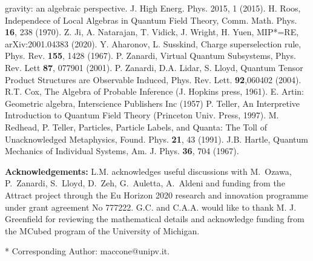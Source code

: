 \documentclass[aps,prl,amsmath,amssymb,twocolumn,nofootinbib]{revtex4}
\theoremstyle{plain}
\theoremstyle{definition}
\theoremstyle{remark}
\begin{document}
\begin{references}
		gravity: an algebraic perspective. J. High Energ. Phys. 2015, 1
		(2015).%
		H. Roos, Independece of Local Algebras in Quantum Field
		Theory, Comm.  Math. Phys. {\bf 16}, 238 (1970).
		Z. Ji, A. Natarajan, T. Vidick, J. Wright, H. Yuen, MIP*=RE, arXiv:2001.04383 (2020). %
		Y. Aharonov, L. Susskind, Charge superselection
		rule, Phys. Rev. {\bf 155}, 1428 (1967).
		P. Zanardi, Virtual Quantum Subsystems, Phys. Rev.
		Lett {\bf 87}, 077901 (2001).
		 P. Zanardi, D.A. Lidar, S. Lloyd, Quantum
		Tensor Product Structures are Observable Induced, Phys. Rev. Lett.
		{\bf 92},060402 (2004).
		R.T. Cox, The Algebra of Probable Inference (J. Hopkins
		press, 1961).
		 E. Artin: Geometric algebra, Interscience Publishers Inc (1957)
		P. Teller, An Interpretive Introduction to Quantum
		Field Theory (Princeton Univ. Press, 1997).  
		M. Redhead, P. Teller, Particles, Particle Labels, and
		Quanta: The Toll of Unacknowledged Metaphysics, Found. Phys. {\bf
			21}, 43 (1991).
		J.B. Hartle, Quantum Mechanics of Individual Systems,
		Am. J.  Phys. {\bf 36}, 704 (1967).
	\end{references}
	
	\baselineskip
	{\bf Acknowledgements:} L.M. acknowledges useful discussions with
	M.~Ozawa, P.~Zanardi, S.~Lloyd, D.~Zeh, G.~Auletta, A.~Aldeni and
	funding from the Attract project through the Eu Horizon 2020 research
	and innovation programme under grant agreement No 777222. G.C. and
	C.A.A. would like to thank M. J. Greenfield for reviewing the mathematical details and acknowledge funding from the MCubed program of the University
	of Michigan.
	
	* Corresponding Author: maccone@unipv.it.
	
	
\end{document}

